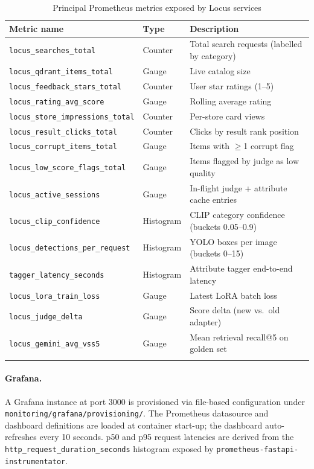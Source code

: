 \documentclass[12pt]{article}
\begin{document}
\begin{longtable}{@{}lll@{}}
\toprule
\textbf{Metric name} & \textbf{Type} & \textbf{Description} \\ \midrule
\endhead
\texttt{locus\_searches\_total}          & Counter   & Total search requests (labelled by category) \\
\texttt{locus\_qdrant\_items\_total}     & Gauge     & Live catalog size \\
\texttt{locus\_feedback\_stars\_total}   & Counter   & User star ratings (1--5) \\
\texttt{locus\_rating\_avg\_score}       & Gauge     & Rolling average rating \\
\texttt{locus\_store\_impressions\_total}& Counter   & Per-store card views \\
\texttt{locus\_result\_clicks\_total}    & Counter   & Clicks by result rank position \\
\texttt{locus\_corrupt\_items\_total}    & Gauge     & Items with $\ge$1 corrupt flag \\
\texttt{locus\_low\_score\_flags\_total} & Gauge     & Items flagged by judge as low quality \\
\texttt{locus\_active\_sessions}         & Gauge     & In-flight judge + attribute cache entries \\
\texttt{locus\_clip\_confidence}         & Histogram & CLIP category confidence (buckets 0.05--0.9) \\
\texttt{locus\_detections\_per\_request} & Histogram & YOLO boxes per image (buckets 0--15) \\
\texttt{tagger\_latency\_seconds}        & Histogram & Attribute tagger end-to-end latency \\
\texttt{locus\_lora\_train\_loss}        & Gauge     & Latest LoRA batch loss \\
\texttt{locus\_judge\_delta}             & Gauge     & Score delta (new vs.\ old adapter) \\
\texttt{locus\_gemini\_avg\_vss5}        & Gauge     & Mean retrieval recall@5 on golden set \\ \bottomrule
\caption{Principal Prometheus metrics exposed by Locus services}
\label{tab:metrics}
\end{longtable}

\paragraph{Grafana.}
A Grafana instance at port 3000 is provisioned via file-based configuration under \texttt{monitoring/grafana/provisioning/}. The Prometheus datasource and dashboard definitions are loaded at container start-up; the dashboard auto-refreshes every 10 seconds. p50 and p95 request latencies are derived from the \texttt{http\_request\_duration\_seconds} histogram exposed by \texttt{prometheus-fastapi-instrumentator}.
\end{document}
